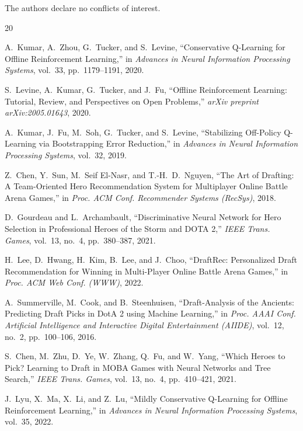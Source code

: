 \documentclass[journal]{IEEEtran}
\begin{document}
The authors declare no conflicts of interest.

\begin{thebibliography}{20}

A.~Kumar, A.~Zhou, G.~Tucker, and S.~Levine, ``Conservative Q-Learning for Offline Reinforcement Learning,'' in \textit{Advances in Neural Information Processing Systems}, vol.~33, pp.~1179--1191, 2020.

S.~Levine, A.~Kumar, G.~Tucker, and J.~Fu, ``Offline Reinforcement Learning: Tutorial, Review, and Perspectives on Open Problems,'' \textit{arXiv preprint arXiv:2005.01643}, 2020.

A.~Kumar, J.~Fu, M.~Soh, G.~Tucker, and S.~Levine, ``Stabilizing Off-Policy Q-Learning via Bootstrapping Error Reduction,'' in \textit{Advances in Neural Information Processing Systems}, vol.~32, 2019.

Z.~Chen, Y.~Sun, M.~Seif El-Nasr, and T.-H.~D.~Nguyen, ``The Art of Drafting: A Team-Oriented Hero Recommendation System for Multiplayer Online Battle Arena Games,'' in \textit{Proc. ACM Conf. Recommender Systems (RecSys)}, 2018.

D.~Gourdeau and L.~Archambault, ``Discriminative Neural Network for Hero Selection in Professional Heroes of the Storm and DOTA 2,'' \textit{IEEE Trans. Games}, vol.~13, no.~4, pp.~380--387, 2021.

H.~Lee, D.~Hwang, H.~Kim, B.~Lee, and J.~Choo, ``DraftRec: Personalized Draft Recommendation for Winning in Multi-Player Online Battle Arena Games,'' in \textit{Proc. ACM Web Conf. (WWW)}, 2022.

A.~Summerville, M.~Cook, and B.~Steenhuisen, ``Draft-Analysis of the Ancients: Predicting Draft Picks in DotA 2 using Machine Learning,'' in \textit{Proc. AAAI Conf. Artificial Intelligence and Interactive Digital Entertainment (AIIDE)}, vol.~12, no.~2, pp.~100--106, 2016.

S.~Chen, M.~Zhu, D.~Ye, W.~Zhang, Q.~Fu, and W.~Yang, ``Which Heroes to Pick? Learning to Draft in MOBA Games with Neural Networks and Tree Search,'' \textit{IEEE Trans. Games}, vol.~13, no.~4, pp.~410--421, 2021.

J.~Lyu, X.~Ma, X.~Li, and Z.~Lu, ``Mildly Conservative Q-Learning for Offline Reinforcement Learning,'' in \textit{Advances in Neural Information Processing Systems}, vol.~35, 2022.


\end{thebibliography}
\end{document}

